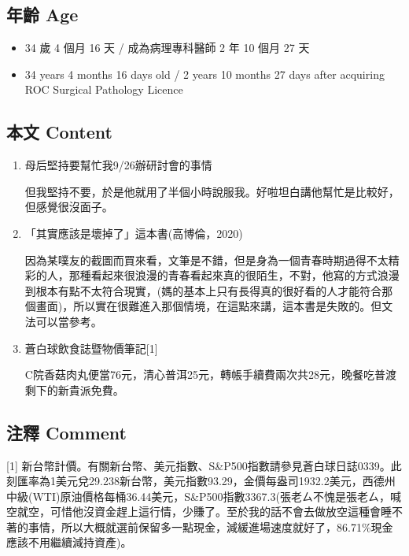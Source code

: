 \documentclass[a5paper, 11pt
]{book}
\providecommand{\tightlist}{%
  \setlength{\itemsep}{0pt}\setlength{\parskip}{0pt}}
\begin{document}
\hypertarget{ux5e74ux9f61-age-7}{%
\subsection{年齡 Age}\label{ux5e74ux9f61-age-7}}

\begin{itemize}
\tightlist
\item
  34 歲 4 個月 16 天 / 成為病理專科醫師 2 年 10 個月 27 天
\item
  34 years 4 months 16 days old / 2 years 10 months 27 days after
  acquiring ROC Surgical Pathology Licence
\end{itemize}

\hypertarget{ux672cux6587-content-7}{%
\subsection{本文 Content}\label{ux672cux6587-content-7}}

\begin{enumerate}
\def\labelenumi{\arabic{enumi}.}
\item
  母后堅持要幫忙我9/26辦研討會的事情

  但我堅持不要，於是他就用了半個小時說服我。好啦坦白講他幫忙是比較好，但感覺很沒面子。
\item
  「其實應該是壞掉了」這本書(高博倫，2020)

  因為某噗友的截圖而買來看，文筆是不錯，但是身為一個青春時期過得不太精彩的人，那種看起來很浪漫的青春看起來真的很陌生，不對，他寫的方式浪漫到根本有點不太符合現實，(媽的基本上只有長得真的很好看的人才能符合那個畫面)，所以實在很難進入那個情境，在這點來講，這本書是失敗的。但文法可以當參考。
\item
  蒼白球飲食誌暨物價筆記{[}1{]}

  C院香菇肉丸便當76元，清心普洱25元，轉帳手續費兩次共28元，晚餐吃普渡剩下的新貴派免費。
\end{enumerate}

\hypertarget{ux6ce8ux91cb-comment-7}{%
\subsection{注釋 Comment}\label{ux6ce8ux91cb-comment-7}}

{[}1{]}
新台幣計價。有關新台幣、美元指數、S\&P500指數請參見蒼白球日誌0339。此刻匯率為1美元兌29.238新台幣，美元指數93.29，金價每盎司1932.2美元，西德州中級(WTI)原油價格每桶36.44美元，S\&P500指數3367.3(張老ㄙ不愧是張老ㄙ，喊空就空，可惜他沒資金趕上這行情，少賺了。至於我的話不會去做放空這種會睡不著的事情，所以大概就選前保留多一點現金，減緩進場速度就好了，86.71\%現金應該不用繼續減持資產)。
\end{document}
